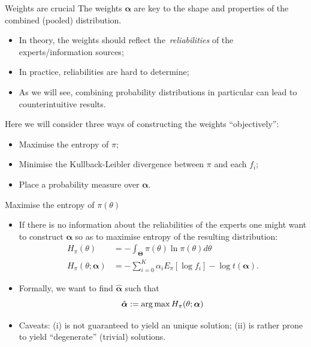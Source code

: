 \begin{frame}{Weights are crucial}
The weights $\boldsymbol\alpha$ are key to the shape and properties of the combined (pooled) distribution.
\begin{itemize}
 \item In theory, the weights should reflect the~\textit{reliabilities} of the experts/information sources;\pause
 \item In practice, reliabilities are hard to determine;\pause
 \item As we will see, combining probability distributions in particular can lead to counterintuitive results.\pause
\end{itemize}
Here we will consider three ways of constructing the weights ``objectively'': 
\begin{itemize}[label=]
 \item Maximise the entropy of $\pi$;\pause
 \item Minimise the Kullback-Leibler divergence between $\pi$ and each $f_i$;\pause
 \item Place a probability measure over $\boldsymbol\alpha$.
\end{itemize}
 \end{frame}
\begin{frame}{Maximise the entropy of $ \pi(\theta)$ }
 \begin{itemize}
  \item If there is no information about the reliabilities of the experts one might want to construct $\boldsymbol\alpha$ so as to maximise entropy of the resulting distribution:
  \begin{align*}
   H_{\pi}(\theta) &=-\int_{\boldsymbol\Theta}\pi(\theta)\ln\pi(\theta)d\theta \\
   H_{\pi}(\theta; \boldsymbol\alpha) &= -\sum_{i=0}^{K} \alpha_i E_{\pi}[\log f_i] - \log t(\boldsymbol\alpha).
  \end{align*}
  \item Formally, we want to find $\hat{\boldsymbol\alpha}$ such that
  \[\hat{\boldsymbol\alpha}:= \operatorname*{arg\,max} H_{\pi}(\theta; \boldsymbol\alpha)  \]
  \item Caveats: (i) is not guaranteed to yield an unique solution; (ii) is rather prone to yield ``degenerate'' (trivial) solutions.
 \end{itemize}
\end{frame}
